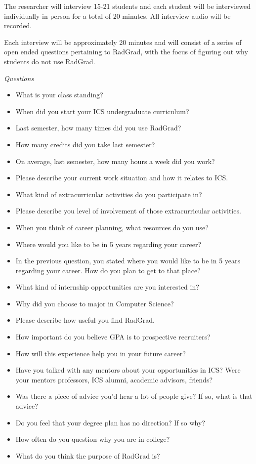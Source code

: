 \documentclass[english]{proposalnsf}
\begin{document}
The researcher will interview 15-21 students and each student will be interviewed individually in person for a total of 20 minutes. All interview audio will be recorded. 
 
Each interview will be approximately 20 minutes and will consist of a series of open ended questions pertaining to RadGrad, with the focus of figuring out why students do not use RadGrad.

{\em Questions}

\begin{itemize}
	\item What is your class standing?
	\item When did you start your ICS undergraduate curriculum?
	\item Last semester, how many times did you use RadGrad? 
	\item How many credits did you take last semester?
	\item On average, last semester, how many hours a week did you work?	
	\item Please describe your current work situation and how it relates to ICS.
	\item What kind of extracurricular activities do you participate in?
	\item Please describe you level of involvement of those extracurricular activities.
	\item When you think of career planning, what resources do you use?
	\item Where would you like to be in 5 years regarding your career?
	\item In the previous question, you stated where you would like to be in 5 years regarding your career. How do you plan to get to that place?
	\item What kind of internship opportunities are you interested in?
	\item Why did you choose to major in Computer Science?
	\item Please describe how useful you find RadGrad.
	\item How important do you believe GPA is to prospective recruiters?
	\item How will this experience help you in your future career?
	\item Have you talked with any mentors about your opportunities in ICS? Were your mentors professors, ICS alumni, academic advisors, friends?
	\item Was there a piece of advice you'd hear a lot of people give? If so, what is that advice?
	\item Do you feel that your degree plan has no direction? If so why?
	\item How often do you question why you are in college?
	\item What do you think the purpose of RadGrad is?

\end{itemize} 
\end{document}
